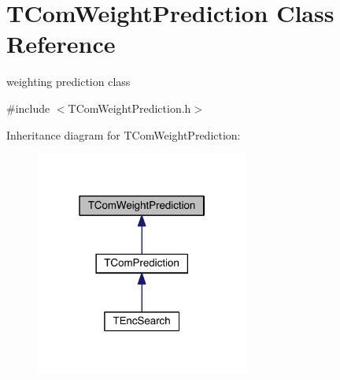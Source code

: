 \hypertarget{class_t_com_weight_prediction}{}\section{T\+Com\+Weight\+Prediction Class Reference}
\label{class_t_com_weight_prediction}


weighting prediction class  




{\ttfamily \#include $<$T\+Com\+Weight\+Prediction.\+h$>$}



Inheritance diagram for T\+Com\+Weight\+Prediction\+:
\nopagebreak
\begin{figure}[H]
\begin{center}
\leavevmode
\includegraphics[width=199pt]{d6/d95/class_t_com_weight_prediction__inherit__graph}
\end{center}
\end{figure}
